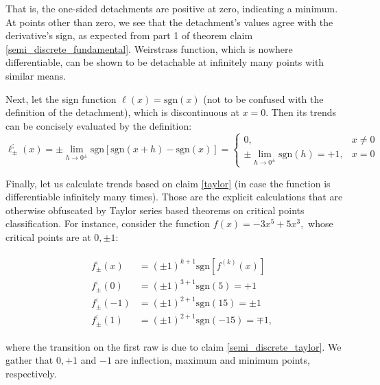 \documentclass[11pt]{book}
\begin{document}
That is, the one-sided detachments are positive at zero, indicating a minimum. At points other than zero, we see that the detachment’s values agree with the derivative’s sign, as expected from part 1 of theorem claim \ref{semi_discrete_fundamental}. Weirstrass function, which is nowhere differentiable, can be shown to be detachable at infinitely many points with similar means.

Next, let the sign function $\ell\left(x\right)=\text{sgn}\left(x\right)$ (not to be confused with the definition of the detachment), which is discontinuous at $x=0$. Then its trends can be concisely evaluated by the definition:
$$\ell_{\pm}^{;}\left(x\right)=\pm \underset{{\scriptscriptstyle h\rightarrow0^{\pm}}}{\lim}\text{sgn}\left[\text{sgn}\left(x+h\right)-\text{sgn}\left(x\right)\right]=\begin{cases}
0, & x\neq0\\
\pm \underset{{\scriptscriptstyle h\rightarrow0^{\pm}}}{\lim}\text{sgn}\left(h\right)=+1, & x=0
\end{cases}$$

Finally, let us calculate trends based on claim \ref{taylor} (in case the function is differentiable infinitely many times). Those are the explicit calculations that are otherwise obfuscated by Taylor series based theorems on critical points classification. For instance, consider the function $f\left(x\right) = -3x^{5}+5x^{3},$ whose critical points are at $0, \pm 1$:

\begin{align}
&\begin{aligned}
f_{\pm}^{;}\left(x\right) & =\left(\pm1\right)^{k+1}\text{sgn}\left[f^{\left(k\right)}\left(x\right)\right]\\
f_{\pm}^{;}\left(0\right) & =\left(\pm1\right)^{3+1}\text{sgn}\left(5\right)=+1\\
f_{\pm}^{;}\left(-1\right) & =\left(\pm1\right)^{2+1}\text{sgn}\left(15\right)=\pm1\\
f_{\pm}^{;}\left(1\right) & =\left(\pm1\right)^{2+1}\text{sgn}\left(-15\right)=\mp1,
\end{aligned}
\end{align}

where the transition on the first raw is due to claim \ref{semi_discrete_taylor}. We gather that $0, +1$ and $-1$ are inflection, maximum and minimum points, respectively.
\end{document}
